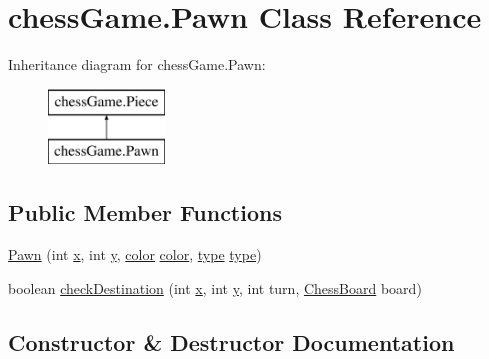 \hypertarget{classchess_game_1_1_pawn}{}\section{chess\+Game.\+Pawn Class Reference}
\label{classchess_game_1_1_pawn}
Inheritance diagram for chess\+Game.\+Pawn\+:\begin{figure}[H]
\begin{center}
\leavevmode
\includegraphics[height=2.000000cm]{classchess_game_1_1_pawn}
\end{center}
\end{figure}
\subsection*{Public Member Functions}
\begin{DoxyCompactItemize}
\item 
\hyperlink{classchess_game_1_1_pawn_a84303d22eb7d028cad8c5788dbf35581}{Pawn} (int \hyperlink{classchess_game_1_1_piece_aeb2d3374492005d799aa6b7b85be40e7}{x}, int \hyperlink{classchess_game_1_1_piece_a56e4d8d18eca3fd03a6bd5d6112d6359}{y}, \hyperlink{classchess_game_1_1_piece_ad5117cbbbaebf3a27c4f3c2bcbd6678b}{color} \hyperlink{classchess_game_1_1_piece_ad5117cbbbaebf3a27c4f3c2bcbd6678b}{color}, \hyperlink{classchess_game_1_1_piece_a1370c7f61581a1b72fa8ac2fd1af70a2}{type} \hyperlink{classchess_game_1_1_piece_a1370c7f61581a1b72fa8ac2fd1af70a2}{type})
\item 
boolean \hyperlink{classchess_game_1_1_pawn_ae85b0f679d8f19efc7d99c155633039f}{check\+Destination} (int \hyperlink{classchess_game_1_1_piece_aeb2d3374492005d799aa6b7b85be40e7}{x}, int \hyperlink{classchess_game_1_1_piece_a56e4d8d18eca3fd03a6bd5d6112d6359}{y}, int turn, \hyperlink{classchess_game_1_1_chess_board}{Chess\+Board} board)
\end{DoxyCompactItemize}


\subsection{Constructor \& Destructor Documentation}
\hypertarget{classchess_game_1_1_pawn_a84303d22eb7d028cad8c5788dbf35581}{}\label{classchess_game_1_1_pawn_a84303d22eb7d028cad8c5788dbf35581} 
